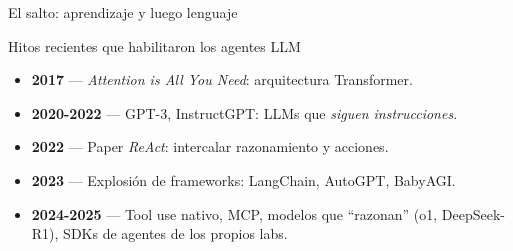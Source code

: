 \begin{frame}{El salto: aprendizaje y luego lenguaje}
  \centering
\end{frame}

\begin{frame}{Hitos recientes que habilitaron los agentes LLM}
  \small
  \begin{itemize}
    \item \textbf{2017} — \emph{Attention is All You Need}: arquitectura Transformer.
    \item \textbf{2020-2022} — GPT-3, InstructGPT: LLMs que \emph{siguen instrucciones}.
    \item \textbf{2022} — Paper \emph{ReAct}: intercalar razonamiento y acciones.
    \item \textbf{2023} — Explosión de frameworks: LangChain, AutoGPT, BabyAGI.
    \item \textbf{2024-2025} — Tool use nativo, MCP, modelos que ``razonan''
      (o1, DeepSeek-R1), SDKs de agentes de los propios labs.
  \end{itemize}
\end{frame}

